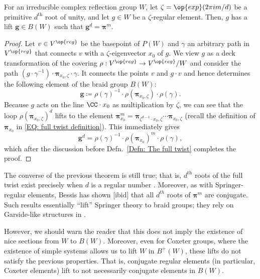\begin{prop}\label{Prop: regular elements lift to roots of the full twist}
For an irreducible complex reflection group $W$, let $\zeta=\op{exp}(2\pi i m/d)$ be a primitive $d^{\text{th}}$ root of unity, and let $g\in W$ be a $\zeta$-regular element. Then, $g$ has a lift $\bm g\in B(W)$ such that $\bm g^d=\bm \pi ^m$.
\end{prop}
\begin{proof}
Let $v\in V^{\op{reg}}$ be the basepoint of $P(W)$ and $\gamma$ an arbitrary path in $V^{\op{reg}}$ that connects $v$ with a $\zeta$-eigenvector $x_0$ of $g$. We view $g$ as a deck transformation of the covering $\rho: V^{\op{reg}}\rightarrow V^{\op{reg}}/W$ and consider the path $(g\cdot \gamma^{-1})\cdot \bm \pi_{x_0,\zeta}\cdot \gamma$.  It connects the points $v$ and $g\cdot v$ and hence determines the following element of the braid group $B(W)$: $$\bm g\coloneqq \rho(\gamma)^{-1}\cdot \rho(\bm \pi_{x_0,\zeta})\cdot \rho(\gamma).$$
Because $g$ acts on the line $\CC\cdot x_0$ as multiplication by $\zeta$, we can see that the loop $\rho( \bm \pi_{x_0,\zeta})^d$ lifts to the element $\bm \pi_{x_0}^m=\bm \pi_{\zeta^{d-1}\cdot x_0,\zeta}\cdots \bm\pi_{x_0,\zeta}$ (recall the definition of $\bm \pi_{x_0}$ in \eqref{EQ: full twist definition}). This immediately gives 
$$\bm g^d=\rho(\gamma)^{-1}\cdot \rho(\bm \pi_{x_0})^m \cdot \rho(\gamma),$$ which after the discussion before Defn.~\ref{Defn: The full twist} completes the proof.
\end{proof}

\begin{rema}
The converse of the previous theorem is still true; that is, $d^{\text{th}}$ roots of the full twist exist precisely when $d$ is a regular number \cite[Thm.~12.4]{bes-kpi1}. Moreover, as with Springer-regular elements, Bessis has shown [ibid] that all $d^{th}$ roots of $\bm\pi^m$ are conjugate. Such results essentially ``lift'' Springer theory to braid groups; they rely on Garside-like structures in \cite{bessis-garside-arxiv}.

However, we should warn the reader that this does not imply the existence of nice sections from $W$ to $B(W)$. Moreover, even for Coxeter groups, where the existence of simple systems allows us to lift $W$ in $B^+(W)$, these lifts do not satisfy the previous properties. That is, conjugate regular elements (in particular, Coxeter elements) lift to not necessarily conjugate elements in $B(W)$.
\end{rema} 



